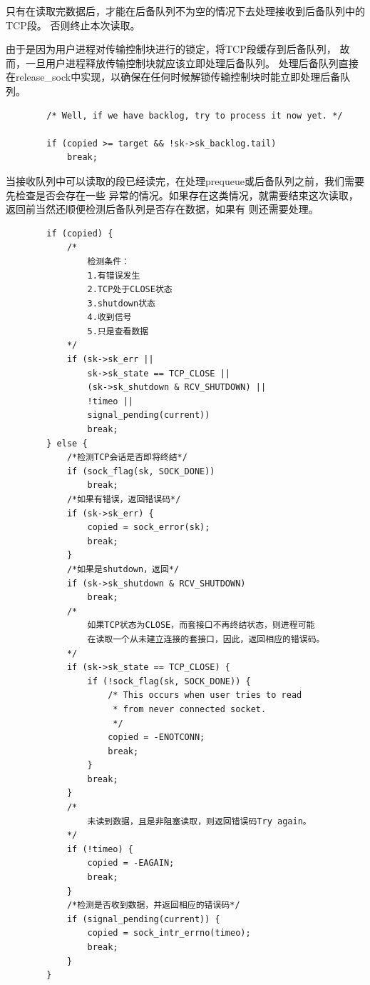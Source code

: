 	只有在读取完数据后，才能在后备队列不为空的情况下去处理接收到后备队列中的TCP段。
	否则终止本次读取。

	由于是因为用户进程对传输控制块进行的锁定，将TCP段缓存到后备队列，
	故而，一旦用户进程释放传输控制块就应该立即处理后备队列。
	处理后备队列直接在release\_sock中实现，以确保在任何时候解锁传输控制块时能立即处理后备队列。
\begin{verbatim}
		/* Well, if we have backlog, try to process it now yet. */

		if (copied >= target && !sk->sk_backlog.tail)
			break;
\end{verbatim}

	当接收队列中可以读取的段已经读完，在处理prequeue或后备队列之前，我们需要先检查是否会存在一些
	异常的情况。如果存在这类情况，就需要结束这次读取，返回前当然还顺便检测后备队列是否存在数据，如果有
	则还需要处理。
\begin{verbatim}
		if (copied) {
			/*
				检测条件：
				1.有错误发生
				2.TCP处于CLOSE状态
				3.shutdown状态
				4.收到信号
				5.只是查看数据
			*/			
			if (sk->sk_err ||
			    sk->sk_state == TCP_CLOSE ||
			    (sk->sk_shutdown & RCV_SHUTDOWN) ||
			    !timeo ||
			    signal_pending(current))
				break;
		} else {
			/*检测TCP会话是否即将终结*/
			if (sock_flag(sk, SOCK_DONE))
				break;
			/*如果有错误，返回错误码*/
			if (sk->sk_err) {
				copied = sock_error(sk);
				break;
			}
			/*如果是shutdown，返回*/
			if (sk->sk_shutdown & RCV_SHUTDOWN)
				break;
			/*
				如果TCP状态为CLOSE，而套接口不再终结状态，则进程可能
				在读取一个从未建立连接的套接口，因此，返回相应的错误码。
			*/
			if (sk->sk_state == TCP_CLOSE) {
				if (!sock_flag(sk, SOCK_DONE)) {
					/* This occurs when user tries to read
					 * from never connected socket.
					 */
					copied = -ENOTCONN;
					break;
				}
				break;
			}
			/*
				未读到数据，且是非阻塞读取，则返回错误码Try again。
			*/
			if (!timeo) {
				copied = -EAGAIN;
				break;
			}
			/*检测是否收到数据，并返回相应的错误码*/
			if (signal_pending(current)) {
				copied = sock_intr_errno(timeo);
				break;
			}
		}
\end{verbatim}

